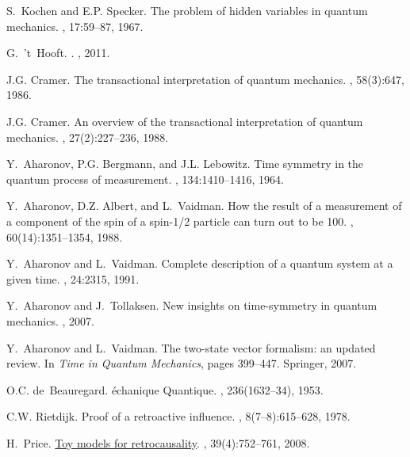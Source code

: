 \documentclass[12pt]{amsart}
\theoremstyle{definition}
\theoremstyle{plain}
\begin{document}
\begin{thebibliography}{10}
S.~Kochen and E.P. Specker.
\newblock The problem of hidden variables in quantum mechanics.
, 17:59--87, 1967.

G.~'t~Hooft.
.
, 2011.

J.G. Cramer.
\newblock The transactional interpretation of quantum mechanics.
, 58(3):647, 1986.

J.G. Cramer.
\newblock An overview of the transactional interpretation of quantum mechanics.
, 27(2):227--236, 1988.

Y.~Aharonov, P.G. Bergmann, and J.L. Lebowitz.
\newblock Time symmetry in the quantum process of measurement.
, 134:1410--1416, 1964.

Y.~Aharonov, D.Z. Albert, and L.~Vaidman.
\newblock How the result of a measurement of a component of the spin of a
  spin-1/2 particle can turn out to be 100.
, 60(14):1351--1354, 1988.

Y.~Aharonov and L.~Vaidman.
\newblock Complete description of a quantum system at a given time.
, 24:2315, 1991.

Y.~Aharonov and J.~Tollaksen.
\newblock New insights on time-symmetry in quantum mechanics.
, 2007.

Y.~Aharonov and L.~Vaidman.
\newblock The two-state vector formalism: an updated review.
\newblock In {\em Time in Quantum Mechanics}, pages 399--447. Springer, 2007.

O.C. de~Beauregard.
\'e{}chanique {Q}uantique.
, 236(1632--34), 1953.

C.W. Rietdijk.
\newblock Proof of a retroactive influence.
, 8(7--8):615--628, 1978.

H.~Price.
\newblock \href{http://philsci-archive.pitt.edu/3906/1/Helsinki.pdf}{Toy models
  for retrocausality}.
,
  39(4):752--761, 2008.


\end{thebibliography}
\end{document}
